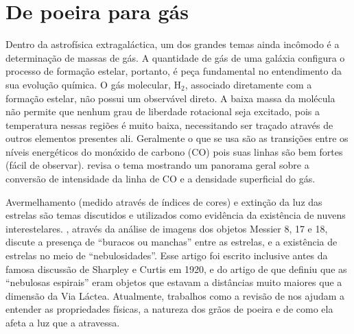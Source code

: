 \section{De poeira para gás}
\label{sec:intro:dust2gas}

Dentro da astrofísica extragaláctica, um dos grandes temas ainda incômodo é a determinação de massas
de gás. A quantidade de gás de uma galáxia configura o processo de formação estelar, portanto, é
peça fundamental no entendimento da sua evolução química. O gás molecular, $\mathrm{H}_2$, associado
diretamente com a formação estelar, não possui um observável direto. A baixa massa da molécula não
permite que nenhum grau de liberdade rotacional seja excitado, pois a temperatura nessas regiões é
muito baixa, necessitando ser traçado através de outros elementos presentes ali. Geralmente o que se
usa são as transições entre os níveis energéticos do monóxido de carbono (CO) pois suas linhas são
bem fortes (fácil de observar). \citep{Bolatto.etal.2013a} revisa o tema mostrando um panorama geral
sobre a conversão de intensidade da linha de CO e a densidade superficial do gás.

Avermelhamento (medido através de índices de cores) e extinção da luz das estrelas são temas
discutidos e utilizados como evidência da existência de nuvens interestelares.
\citet{Barnard.1908a}, através da análise de imagens dos objetos Messier 8, 17 e 18, discute a
presença de ``buracos ou manchas'' entre as estrelas, e a existência de estrelas no meio de
``nebulosidades''. Esse artigo foi escrito inclusive antes da famosa discussão de Sharpley e Curtis
em 1920, e do artigo de \citet{Hubble.1925a} que definiu que as ``nebulosas espirais'' eram objetos
que estavam a distâncias muito maiores que a dimensão da Via Láctea. Atualmente, trabalhos como a
revisão de \citet{Draine.2003a} nos ajudam a entender as propriedades físicas, a natureza dos
grãos de poeira e de como ela afeta a luz que a atravessa.

